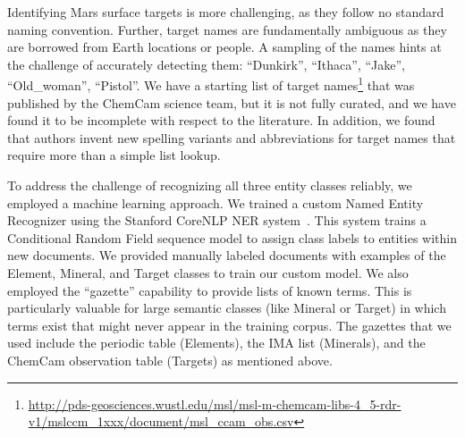 \documentclass[letterpaper]{article} %
\begin{document}
Identifying Mars surface targets is more challenging, as they follow
no standard naming convention.  Further, target names are
fundamentally ambiguous as they are borrowed from Earth locations or
people.  A sampling of the names hints at the challenge of accurately
detecting them: ``Dunkirk'', ``Ithaca'', ``Jake'', ``Old\_woman'',
``Pistol''.  We have a starting list of target
names\footnote{\url{http://pds-geosciences.wustl.edu/msl/msl-m-chemcam-libs-4_5-rdr-v1/mslccm_1xxx/document/msl_ccam_obs.csv}}
that was published by the ChemCam science team, but it is not fully
curated, and we have found it to be incomplete with respect to the
literature.
%
In addition, we found that authors invent new spelling
variants and abbreviations for target names that require more than a
simple list lookup.

To address the challenge of recognizing all three entity classes
reliably, we employed a machine learning approach.  We trained a
custom Named Entity Recognizer using the Stanford CoreNLP NER
system~\cite{finkel:ner05}.  This system trains a Conditional Random
Field sequence model to assign class labels to entities within new
documents.  We provided manually labeled documents with examples of
the Element, Mineral, and Target classes to train our custom
model.  We also employed the ``gazette'' capability to provide lists
of known terms.  This is particularly valuable for large semantic
classes (like Mineral or Target) in which terms exist that might never
appear in the training corpus.  The gazettes that we used include the
periodic table (Elements), the IMA list (Minerals), and the ChemCam
observation table (Targets) as mentioned above.




\end{document}
